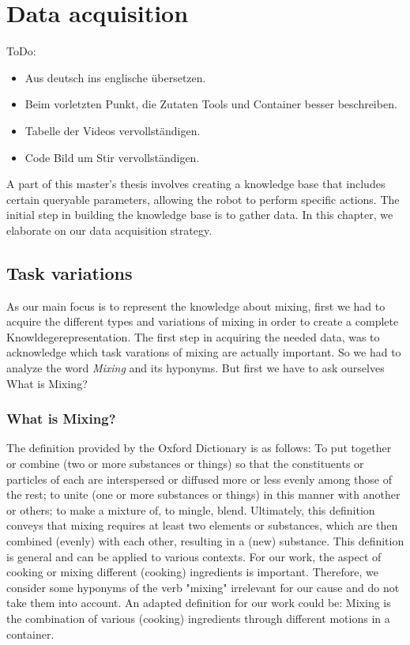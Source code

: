 \chapter*{Data acquisition}
ToDo:
\begin{itemize}
  \item Aus deutsch ins englische übersetzen.
  \item Beim vorletzten Punkt, die Zutaten Tools und Container besser beschreiben.
  \item Tabelle der Videos vervollständigen.
  \item Code Bild um Stir vervollständigen. 
\end{itemize}
A part of this master's thesis involves creating a knowledge base that includes certain queryable parameters, allowing the robot to perform specific actions. The initial step in building the knowledge base is to gather data. In this chapter, we elaborate on our data acquisition strategy.
\section*{Task variations}
	As our main focus is to represent the knowledge about mixing, first we had to acquire the different types and variations of mixing in order to create a complete Knowldegerepresentation. The first step in acquiring the needed data, was to acknowledge which task varations of mixing are actually important. 
  So we had to analyze the word \textit{Mixing} and its hyponyms. But first we have to ask ourselves What is Mixing?
  \subsection*{What is Mixing?}
  The definition provided by the Oxford Dictionary is as follows: To put together or combine (two or more substances or things) so that the constituents or particles of each are interspersed or diffused more or less evenly among those of the rest; to unite (one or more substances or things) in this manner with another or others; to make a mixture of, to mingle, blend.
  Ultimately, this definition conveys that mixing requires at least two elements or substances, which are then combined (evenly) with each other, resulting in a (new) substance.
  This definition is general and can be applied to various contexts. For our work, the aspect of cooking or mixing different (cooking) ingredients is important. Therefore, we consider some hyponyms of the verb "mixing" irrelevant for our cause and do not take them into account.
  An adapted definition for our work could be: Mixing is the combination of various (cooking) ingredients through different motions in a container.
  
